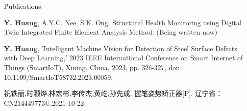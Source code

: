 \documentclass{resume} %
\begin{document}
\begin{rSection}{Publications}
\begin{rSubsection}{}{}
{}{}
	\item { {\bf Y. Huang}, A.Y.C. Nee, S.K. Ong. Structural Health Monitoring using Digital Twin Integrated Finite Element Analysis Method. (Being written now) }\\
	\item {{\bf Y. Huang}, 'Intelligent Machine Vision for Detection of Steel Surface Defects with Deep Learning,' 2023 IEEE International Conference on Smart Internet of Things (SmartIoT), Xining, China, 2023, pp. 326-327, doi: 10.1109/SmartIoT58732.2023.00059.}\\
  \item {\fangsong 祝铁丽,时灏烨,林宏彬,李传杰,黄屹,孙先成. 握笔姿势矫正器[P]. 辽宁省：CN214449773U,2021-10-22.}\\
\end{rSubsection}
\end{rSection}


\end{document}
